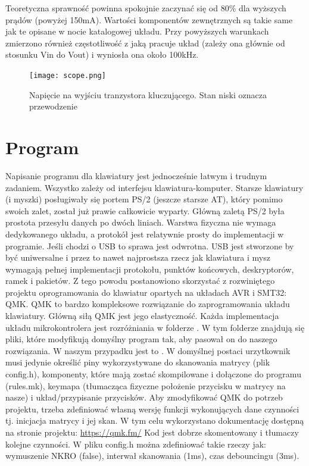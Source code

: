 \documentclass{article}
\begin{document}
    Teoretyczna sprawność powinna spokojnie zaczynać się od 80\% dla wyższych prądów (powyżej 150mA). Wartości komponentów zewnętrznych są takie same jak
    te opisane w nocie katalogowej układu. Przy powyższych warunkach zmierzono również częstotliwość z jaką pracuje układ (zależy ona głównie od stosunku Vin do Vout)
    i wyniosła ona około 100kHz.
    \begin{figure}[h]
        \centering
        \texttt{[image: scope.png]}
        \caption{Napięcie na wyjściu tranzystora kluczującego. Stan niski oznacza przewodzenie}
    \end{figure}
    \section{Program}
    Napisanie programu dla klawiatury jest jednocześnie łatwym i trudnym zadaniem. Wszystko zależy od interfejsu klawiatura-komputer.
    Starsze klawiatury (i myszki) posługiwały się portem PS/2 (jeszcze starsze AT), który pomimo swoich zalet, został już prawie całkowicie wyparty.
    Główną zaletą PS/2 była prostota przesyłu danych po dwóch liniach. Warstwa fizyczna nie wymaga dedykowanego układu, a protokół jest relatywnie prosty
    do implementacji w programie.\newline
    Jeśli chodzi o USB to sprawa jest odwrotna. USB jest stworzone by być uniwersalne i przez to nawet najprostsza rzecz jak klawiatura i mysz
    wymagają pełnej implementacji protokołu, punktów końcowych, deskryptorów, ramek i pakietów. Z tego powodu postanowiono skorzystać z rozwiniętego
    projektu oprogramowania do klawiatur opartych na układach AVR i SMT32: QMK. QMK to bardzo kompleksowe rozwiązanie do zaprogramowania układu klawiatury.
    Główną siłą QMK jest jego elastyczność.
    Każda implementacja układu mikrokontrolera jest rozróżniania w folderze .
    W tym folderze znajdują się pliki, które modyfikują domyślny program tak, aby pasował on do naszego rozwiązania. W naszym przypadku jest to 
    .
    W domyślnej postaci urzytkownik musi jedynie określić piny wykorzystywane do skanowania matrycy (plik config.h), komponenty, które mają zostać skompilowane i
    dołączone do programu (rules.mk), keymapa (tłumacząca fizyczne położenie przycisku w matrycy na nasze) i układ/przypisanie przycisków.\newline
    Aby zmodyfikować QMK do potrzeb projektu, trzeba zdefiniować własną wersję funkcji wykonujących dane czynności tj. inicjacja matrycy i jej skan.
    W tym celu wykorzystano dokumentację dostępną na stronie projektu: \url{https://qmk.fm/} 
    Kod jest dobrze skomentowany i tłumaczy kolejne czynności.
    W pliku config.h można zdefiniować takie rzeczy jak: wymuszenie NKRO (false), interwał skanowania (1ms), czas debouncingu (3ms).
\end{document}
